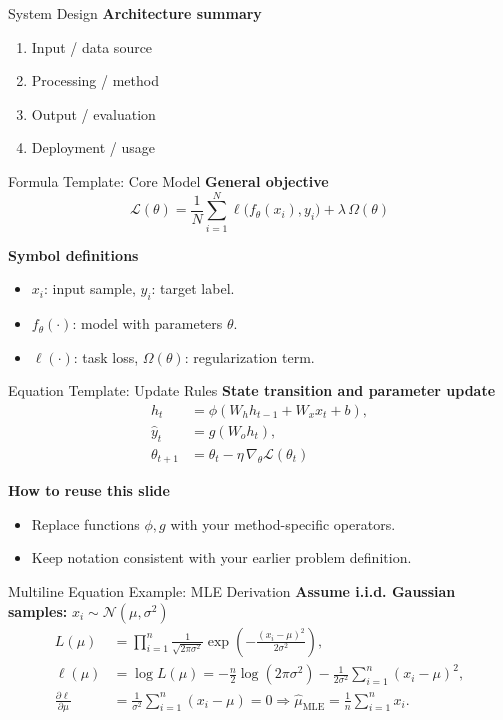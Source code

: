\documentclass[aspectratio=169]{beamer}
\begin{document}
\begin{frame}{System Design}
\textbf{Architecture summary}
\begin{enumerate}
  \item Input / data source
  \item Processing / method
  \item Output / evaluation
  \item Deployment / usage
\end{enumerate}
\end{frame}

\begin{frame}{Formula Template: Core Model}
\textbf{General objective}
\begin{equation}
\mathcal{L}(\theta) = \frac{1}{N}\sum_{i=1}^{N} \ell\bigl(f_{\theta}(x_i), y_i\bigr) + \lambda\,\Omega(\theta)
\end{equation}

\textbf{Symbol definitions}
\begin{itemize}
  \item $x_i$: input sample, $y_i$: target label.
  \item $f_{\theta}(\cdot)$: model with parameters $\theta$.
  \item $\ell(\cdot)$: task loss, $\Omega(\theta)$: regularization term.
\end{itemize}
\end{frame}

\begin{frame}{Equation Template: Update Rules}
\textbf{State transition and parameter update}
\begin{align}
h_t &= \phi\left(W_h h_{t-1} + W_x x_t + b\right), \\
\hat{y}_t &= g\left(W_o h_t\right), \\
\theta_{t+1} &= \theta_t - \eta\,\nabla_{\theta} \mathcal{L}(\theta_t)
\end{align}

\textbf{How to reuse this slide}
\begin{itemize}
  \item Replace functions $\phi, g$ with your method-specific operators.
  \item Keep notation consistent with your earlier problem definition.
\end{itemize}
\end{frame}

\begin{frame}{Multiline Equation Example: MLE Derivation}
\textbf{Assume i.i.d. Gaussian samples:} $x_i \sim \mathcal{N}(\mu,\sigma^2)$
\begin{align}
L(\mu) &= \prod_{i=1}^{n} \frac{1}{\sqrt{2\pi\sigma^2}}\exp\!\left(-\frac{(x_i-\mu)^2}{2\sigma^2}\right), \\
\ell(\mu) &= \log L(\mu)
= -\frac{n}{2}\log(2\pi\sigma^2) - \frac{1}{2\sigma^2}\sum_{i=1}^{n}(x_i-\mu)^2, \\
\frac{\partial \ell}{\partial \mu}
&= \frac{1}{\sigma^2}\sum_{i=1}^{n}(x_i-\mu)=0
\Rightarrow \hat{\mu}_{\text{MLE}} = \frac{1}{n}\sum_{i=1}^{n}x_i.
\end{align}
\end{frame}
\end{document}
